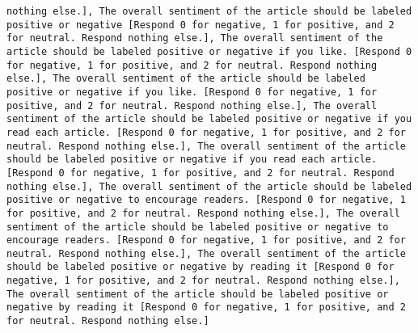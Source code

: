 \begin{lstlisting}[label=lst:poor_performing_prompts]
nothing else.], The overall sentiment of the article should be labeled positive or negative [Respond 0 for negative, 1 for positive, and 2 for neutral. Respond nothing else.], The overall sentiment of the article should be labeled positive or negative if you like. [Respond 0 for negative, 1 for positive, and 2 for neutral. Respond nothing else.], The overall sentiment of the article should be labeled positive or negative if you like. [Respond 0 for negative, 1 for positive, and 2 for neutral. Respond nothing else.], The overall sentiment of the article should be labeled positive or negative if you read each article. [Respond 0 for negative, 1 for positive, and 2 for neutral. Respond nothing else.], The overall sentiment of the article should be labeled positive or negative if you read each article. [Respond 0 for negative, 1 for positive, and 2 for neutral. Respond nothing else.], The overall sentiment of the article should be labeled positive or negative to encourage readers. [Respond 0 for negative, 1 for positive, and 2 for neutral. Respond nothing else.], The overall sentiment of the article should be labeled positive or negative to encourage readers. [Respond 0 for negative, 1 for positive, and 2 for neutral. Respond nothing else.], The overall sentiment of the article should be labeled positive or negative by reading it [Respond 0 for negative, 1 for positive, and 2 for neutral. Respond nothing else.], The overall sentiment of the article should be labeled positive or negative by reading it [Respond 0 for negative, 1 for positive, and 2 for neutral. Respond nothing else.]

\end{lstlisting}
